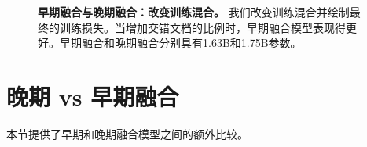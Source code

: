 \begin{table}[htb]
    \centering
    \setlength{\tabcolsep}{16pt}
    \renewcommand{\arraystretch}{1}
    \caption{\textbf{视觉编码器缩放器。} 从头开始训练晚期融合模型时，降低视觉编码器的学习率效果更好。}
    \label{tab:late_scaler_scratch}
\end{table}








\begin{figure}[htp]
    \centering
    \captionsetup{type=figure}
    \begin{subfigure}[t]{0.33\linewidth}
        
    \end{subfigure}
    \begin{subfigure}[t]{0.32\linewidth}
         
    \end{subfigure}
    \begin{subfigure}[t]{0.32\linewidth}
         
    \end{subfigure}
            
    \vspace{0.3cm}
    \caption{\textbf{早期融合与晚期融合：改变训练混合。} 我们改变训练混合并绘制最终的训练损失。当增加交错文档的比例时，早期融合模型表现得更好。早期融合和晚期融合分别具有1.63B和1.75B参数。}
    \label{fig:early_vs_late_datatype_sameflops}
\end{figure}


\section{晚期 vs 早期融合}
\label{app:late_vs_early}
本节提供了早期和晚期融合模型之间的额外比较。

